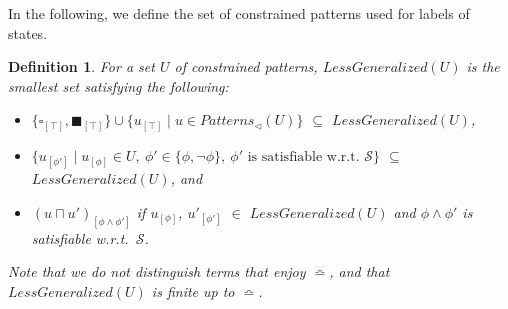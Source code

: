 \documentclass[copyright,creativecommons]{eptcs}
\newtheorem{definition}{Definition}
\newcommand{\cS}{\mathcal{S}}
\newcommand{\TwC}[2]{{#1}_{[#2]}}
\newcommand{\Subpatterns}{{\mathit{Patterns}_{\lhd}}}
\newcommand{\Inst}{{\mathit{LessGeneralized}}}
\begin{document}
In the following, we define the set of constrained patterns used for
labels of states.
\begin{definition}
For a set $U$ of constrained patterns, $\Inst(U)$ is the smallest set
 satisfying the following:
 \begin{itemize}
  \item $\{\TwC{\square}{\top}, \TwC{\blacksquare}{\top} \}
	\cup \{ \TwC{u}{\top} \mid u \in \Subpatterns(U) \}$
	$\subseteq$ $\Inst(U)$,
  \item $\{ \TwC{u}{\phi'} \mid \TwC{u}{\phi} \in U,
	~
	\phi' \in \{ \phi, \neg \phi \},
	~
	\mbox{$\phi'$ is satisfiable w.r.t.\ $\cS$} \}$
	$\subseteq$ $\Inst(U)$,
	and
  \item $\TwC{(u \sqcap u')}{\phi\wedge\phi'}$ if
	$\TwC{u}{\phi}$, $\TwC{u'}{\phi'}$ $\in$ $\Inst(U)$
	and $\phi\wedge\phi'$ is satisfiable w.r.t.\ $\cS$.
 \end{itemize}
Note that we do not distinguish terms that enjoy $\bumpeq$, and that
 $\Inst(U)$ is finite up to $\bumpeq$. 
\end{definition}
\end{document}
